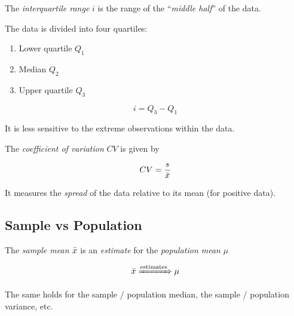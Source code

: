 \begin{definition}
    The \textit{interquartile range} $i$ is the range of the \enquote{\textit{middle half}} of the data.
    
    The data is divided into four quartiles:
    \begin{enumerate}
        \item Lower quartile $Q_1$
        \item Median $Q_2$
        \item Upper quartile $Q_3$
    \end{enumerate}
    
    \begin{equation}
        i = Q_3 - Q_1
    \end{equation}
    
    It is less sensitive to the extreme observations within the data.
\end{definition}

\begin{definition}
    The \textit{coefficient of variation} $CV$ is given by
    
    \begin{equation}
        CV = \frac{s}{\Bar{x}}
    \end{equation}
    
    It measures the \textit{spread} of the data relative to its mean (for positive data).
\end{definition}

\subsection{Sample vs Population}

\begin{definition}
    The \textit{sample mean} $\Bar{x}$ is an \textit{estimate} for the \textit{population mean} $\mu$
    
    \begin{equation}
        \Bar{x}
        \xRightarrow{\text{estimates}}
        \mu
    \end{equation}
    
    The same holds for the sample / population median, the sample / population variance, etc.
\end{definition}
